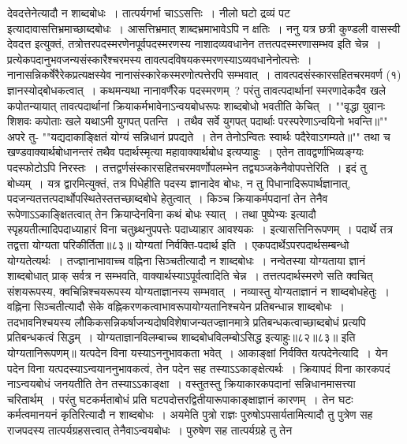 देवदत्तेनेत्यादौ न शाब्दबोधः~। तात्पर्यगर्भा चाऽऽसत्तिः~। नीलो घटो द्रव्यं पट इत्यादावासत्तिभ्रमाच्छाब्दबोधः~। आसत्तिभ्रमात् शाब्दभ्रमाभावेऽपि न क्षतिः~।
ननु यत्र छत्री कुण्डली वासस्वी देवदत्त इत्युक्तं, तत्रोत्तरपदस्मरणेनपूर्वपदस्मरणस्य नाशादव्यवधानेन तत्तत्पदस्मरणासम्भव इति चेन्न~।
प्रत्येकपदानुभवजन्यसंस्कारैश्चरमस्य तावत्पदविषयकस्मरणस्याऽव्यवधानेनोत्पत्तेः~। नानासन्निकर्षेरैरेकप्रत्यक्षस्येव नानासंस्कारेकस्मरणोत्पत्तेरपि सम्भवात्~।
तावत्पदसंस्कारसहितचरमवर्ण (१) ज्ञानस्योद्बोधकत्वात्~। कथमन्यथा नानावर्णैरेक पदस्मरणम्~?
परंतु तावत्पदार्थानां स्मरणादेकदैव खले कपोतन्यायात् तावत्पदार्थानां क्रियाकर्मभावेनाऽन्वयबोधरूपः शाब्दबोधो भवतीति केचित्~।
""वृद्धा युवानः शिशवः कपोताः खले यथाऽमी युगपत् पतन्ति~।
तथैव सर्वे युगपत् पदार्थाः परस्परेणाऽन्वयिनो भवन्ति॥""
अपरे तु-
""यद्यदाकाङ्क्षितं योग्यं सन्निधानं प्रपद्यते~।
तेन तेनोऽन्वितः स्वार्थः पदैरेवाऽगम्यते॥""
तथा च खण्डवाक्यार्थबोधानन्तरं तथैव पदार्थस्मृत्या महावाक्यार्थबोध इत्यप्याहुः~।
एतेन तावद्वर्णाभिव्यङ्ग्यः पदस्फोटोऽपि निरस्तः~। तत्तद्वर्णसंस्कारसहितचरमवर्णोपलम्भेन तद्व्यञ्जकेनैवोपपत्तेरिति~।
इदं तु बोध्यम्~। यत्र द्वारमित्युक्तं, तत्र पिधेहीति पदस्य ज्ञानादेव बोधः, न तु पिधानादिरूपार्थज्ञानात्, पदजन्यतत्तत्पदार्थोपस्थितेस्तत्तच्छाब्दबोधे हेतुत्वात्~। किञ्च
क्रियाकर्मपदानां तेन तेनैव रूपेणाऽऽकाङ्क्षितत्वात् तेन क्रियाप्देनविना कथं बोधः स्यात्~। तथा पुष्पेभ्यः इत्यादौ स्पृहयतीत्मादिपदाध्याहारं विना चतुथ्र्थनुपपत्तेः
पदाध्याहार आवश्यकः~। इत्यासत्तिनिरूपणम्~।
पदार्थे तत्र तद्वत्ता योग्यता परिकीर्तिता॥८३॥
योग्यतां निर्वक्ति-पदार्थ इति~। एकपदार्थेऽपरपदार्थसम्बन्धो योग्यतेत्यर्थः~। तज्ज्ञानाभावाच्च वह्निना सिञ्चतीत्यादौ न शाब्दबोधः~। नन्वेतस्या योग्यताया ज्ञानं
शाब्दबोधात् प्राक् सर्वत्र न सम्भवति, वाक्यार्थस्याऽपूर्वत्वादिति चेन्न~। तत्तत्पदार्थस्मरणे सति क्वचित् संशयरूपस्य, क्वचिन्निश्चयरूपस्य योग्यताज्ञानस्य सम्भवात्~।
नव्यास्तु योग्यताज्ञानं न शाब्दबोधहेतुः~। वह्निना सिञ्चतीत्यादौ सेके वह्निकरणकत्वाभावरूपायोग्यतानिश्चयेन प्रतिबन्धान्न शाब्दबोधः~। तदभावनिश्चयस्य
लौकिकसन्निकर्षाजन्यदोषविशेषाजन्यतज्ज्ञानमात्रे प्रतिबन्धकत्वाच्छाब्दबोधं प्रत्यपि प्रतिबन्धकत्वं सिद्धम्~। योग्यताज्ञानविलम्बाच्च शाब्दबोधविलम्बोऽसिद्ध इत्याहुः॥८२॥८३॥
इति योग्यतानिरूपणम्॥
यत्पदेन विना यस्याऽननुभावकता भवेत्~।
आकाङ्क्षां निर्वक्ति यत्पदेनेत्यादि~। येन पदेन विना यत्पदस्याऽन्वयाननुभावकत्वं, तेन पदेन सह तस्याऽऽकाङ्क्षेत्यर्थः~। क्रियापदं विना कारकपदं नाऽन्वयबोधं
जनयतीति तेन तस्याऽऽकाङ्क्षा~।
वस्तुतस्तु क्रियाकारकपदानां सन्निधानमासत्त्या चरितार्थम्~। परंतु घटकर्मताबोधं प्रति घटपदोत्तरद्वितीयारूपाकाङ्क्षाज्ञानं कारणम्~। तेन घटः कर्मत्वमानयनं
कृतिरित्यादौ न शाब्दबोधः~। अयमेति पुत्रो राज्ञः पुरुषोऽपसार्यतामित्यादौ तु पुत्रेण सह राजपदस्य तात्पर्यग्रहसत्त्वात् तेनैवाऽन्वयबोधः~। पुरुषेण सह तात्पर्यग्रहे तु तेन
